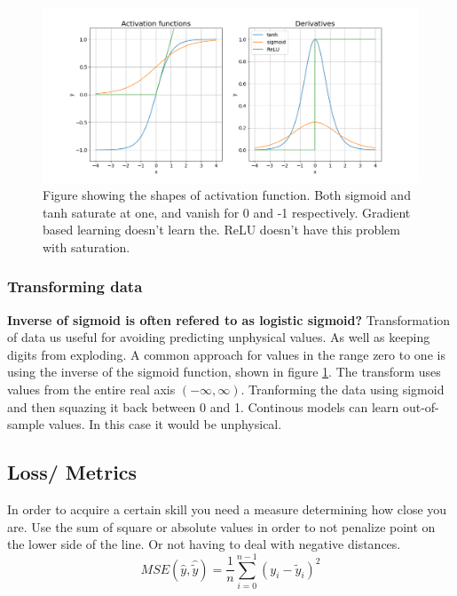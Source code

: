 \documentclass{article}
\begin{document}
\begin{figure}
    \centering
    \includegraphics[scale = 0.5]{activation_functions_and_derivatives.png}
    \caption{Figure showing the shapes of activation function. Both sigmoid and tanh saturate at one, and vanish for 0 and -1 respectively. Gradient based learning doesn't learn the. ReLU doesn't have this problem with saturation.}
    \label{fig:activation_func_plus}
\end{figure}

%

\subsubsection{Transforming data} \label{sec:transforming_cloud_cover}
\textbf{Inverse of sigmoid is often refered to as logistic sigmoid?}
Transformation of data us useful for avoiding predicting unphysical values. As well as keeping digits from exploding.
A common approach for values in the range zero to one is using the inverse of the sigmoid function, shown in figure \ref{fig:activation_func_plus}. The transform uses values from the entire real axis $(-\infty, \infty)$. 
%
Tranforming the data using sigmoid and then squazing it back between 0 and 1. 
Continous models can learn out-of-sample values. In this case it would be unphysical.

\subsection{Loss/ Metrics}  \label{sec:metrics}
In order to acquire a certain skill you need a measure determining how close you are. 
Use the sum of square or absolute values in order to not penalize point on the lower side of the line. Or not having to deal with negative distances. 
\begin{equation} \label{eq:mse}
    MSE(\hat{y},\hat{\tilde{y}}) = \frac{1}{n} \sum_{i=0}^{n-1}(y_i-\tilde{y}_i)^2
\end{equation} 
\end{document}
